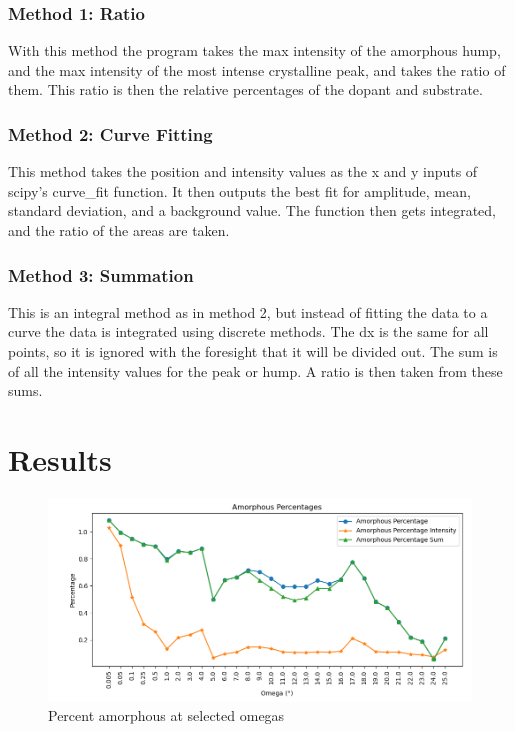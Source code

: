 \documentclass{article}
\begin{document}
\begin{multicols}{2}
    \subsubsection*{Method 1: Ratio}

        With this method the program takes the max intensity of the amorphous hump, and the max intensity of the most intense crystalline peak, and takes the ratio of them. 
        This ratio is then the relative percentages of the dopant and substrate\citep{pandey_structural_2021}.

    \subsubsection*{Method 2: Curve Fitting}

        This method takes the position and intensity values as the x and y inputs of scipy's curve\_fit function. 
        It then outputs the best fit for amplitude, mean, standard deviation, and a background value. 
        The function then gets integrated, and the ratio of the areas are taken.

    \subsubsection*{Method 3: Summation}

        This is an integral method as in method 2, but instead of fitting the data to a curve the data is integrated using discrete methods. 
        The dx is the same for all points, so it is ignored with the foresight that it will be divided out. 
        The sum is of all the intensity values for the peak or hump. 
        A ratio is then taken from these sums.

\section{Results}
    
    \begin{figure}[H]
        \centering
        \includegraphics[width=\linewidth]{Mixture Line Graph (amorphous)_final.png}
        \caption{Percent amorphous at selected omegas}
        \label{fig:line graph amorphous}
    \end{figure}


\end{multicols}
\end{document}
